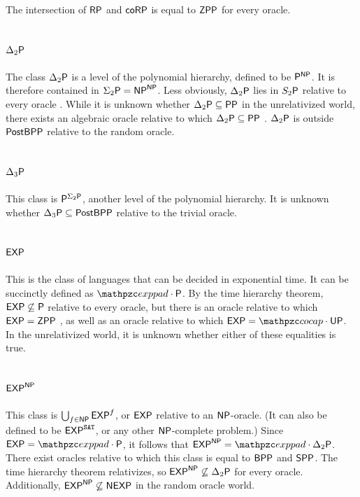 The intersection of $\mathsf{RP}$ and $\mathsf{co}\mathsf{RP}$ is equal to $\mathsf{ZPP}$ for 
every oracle.

\subsection{$\Delta_2\mathsf{P}$}

The class $\Delta_2\mathsf{P}$ is a level of the polynomial hierarchy, defined to be 
$\mathsf{P}^{\mathsf{NP}}$. It is therefore contained in $\Sigma_2\mathsf{P}=\mathsf{NP}^{\mathsf{NP}}$. Less obviously,
$\Delta_2\mathsf{P}$ lies in $S_2\mathsf{P}$ relative to every oracle 
\cite{russell1998symmetric}. While it is unknown whether 
$\Delta_2\mathsf{P}\subseteq\mathsf{PP}$ in the unrelativized world, there exists an 
algebraic oracle relative to which $\Delta_2\mathsf{P}\subseteq\mathsf{PP}$ 
\cite{aaronson2009algebrization}. $\Delta_2\mathsf{P}$ is outside $\mathsf{PostBPP}$ 
relative to the random oracle.

\subsection{$\Delta_3\mathsf{P}$}

This class is $\mathsf{P}^{\Sigma_2\mathsf{P}}$, another level of the polynomial hierarchy. It
is unknown whether $\Delta_3\mathsf{P}\subseteq\mathsf{PostBPP}$ relative to the trivial 
oracle.

\subsection{$\mathsf{EXP}$}

This is the class of languages that can be decided in exponential time. It can 
be succinctly defined as $\exppad\cdot\sP$. By the time hierarchy theorem, 
$\mathsf{EXP}\not\subseteq\mathsf{P}$ relative to every oracle, but there is an oracle 
relative to which $\mathsf{EXP}=\mathsf{ZPP}$ \cite{Heller1984}, as well as an oracle 
relative to which $\msf{EXP}=\cocap\cdot\msf{UP}$. In the unrelativized world, 
it is unknown whether either of these equalities is true.

\subsection{$\mathsf{EXP}^{\mathsf{NP}}$}

This class is $\bigcup_{f\in\mathsf{NP}}\mathsf{EXP}^f$, or $\mathsf{EXP}$ relative to an 
$\mathsf{NP}$-oracle. (It can also be defined to be $\mathsf{EXP}^{\mathtt{SAT}}$, or 
any other $\mathsf{NP}$-complete problem.) Since $\msf{EXP}=\exppad\cdot\sP$, it follows
that $\msf{EXP}^\NP=\exppad\cdot\Delta_2\sP$. There exist oracles relative to 
which this class is equal to $\mathsf{BPP}$ \cite{buhrman2000randomness} and 
$\mathsf{SPP}$. The time hierarchy theorem relativizes, so 
$\mathsf{EXP}^{\mathsf{NP}}\not\subseteq\Delta_2\mathsf{P}$ for every oracle. Additionally, 
$\mathsf{EXP}^{\mathsf{NP}}\not\subseteq\mathsf{NEXP}$ in the random oracle world.

